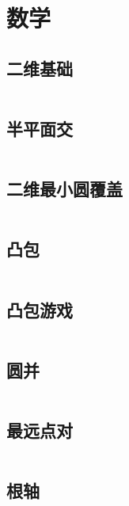 \chapter{数学}
\section{二维基础}
\inputminted{cpp}{./computational_geometry/two_dimensions_basic.cpp}
\section{半平面交}
\inputminted{cpp}{./computational_geometry/half_plane_intersection.cpp}
\section{二维最小圆覆盖}
\inputminted{cpp}{./computational_geometry/2D-minimum-circle-coverage.cpp}
\section{凸包}
\inputminted{cpp}{./computational_geometry/convex_hull.cpp}
\section{凸包游戏}
\inputminted{cpp}{./computational_geometry/convex_hull_game.cpp}
\section{圆并}
\inputminted{cpp}{./computational_geometry/circle_union.cpp}
\section{最远点对}
\inputminted{cpp}{./computational_geometry/farthest_point_pair.cpp}
\section{根轴}
